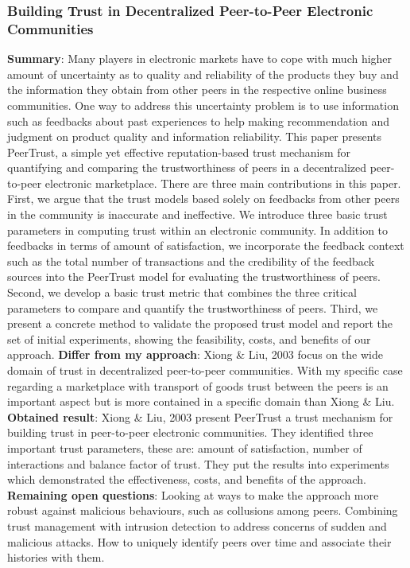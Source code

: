 \subsubsection{Building Trust in Decentralized Peer-to-Peer Electronic Communities \cite{buildTrust}}
\textbf{Summary}: Many players in electronic markets have to cope with much higher amount of uncertainty as to quality and reliability of the products they buy and the information they obtain from other peers in the respective online business communities. One way to address this uncertainty problem is to use information such as feedbacks about past experiences to help making recommendation and judgment on product quality and information reliability. This paper presents PeerTrust, a simple yet effective reputation-based trust mechanism for quantifying and comparing the trustworthiness of peers in a decentralized peer-to-peer electronic marketplace. There are three main contributions in this paper. First, we argue that the trust models based solely on feedbacks from other peers in the community is inaccurate and ineffective. We introduce three basic trust parameters in computing trust within an electronic community. In addition to feedbacks in terms of amount of satisfaction, we incorporate the feedback context such as the total number of transactions and the credibility of the feedback sources into the PeerTrust model for evaluating the trustworthiness of peers. Second, we develop a basic trust metric that combines the three critical parameters to compare and quantify the trustworthiness of peers. Third, we present a concrete method to validate the proposed trust model and report the set of initial experiments, showing the feasibility, costs, and benefits of our approach.\newline
\textbf{Differ from my approach}: Xiong \& Liu, 2003 focus on the wide domain of trust in decentralized peer-to-peer communities. With my specific case regarding a marketplace with transport of goods trust between the peers is an important aspect but is more contained in a specific domain than Xiong \& Liu.\newline
\textbf{Obtained result}: Xiong \& Liu, 2003 present PeerTrust a trust mechanism for building trust in peer-to-peer electronic communities. They identified three important trust parameters, these are: amount of satisfaction, number of interactions and balance factor of trust. They put the results into experiments which demonstrated the effectiveness, costs, and benefits of the approach.\newline
\textbf{Remaining open questions}: Looking at ways to make the approach more robust against malicious behaviours, such as collusions among peers. Combining trust management with intrusion detection to address concerns of sudden and malicious attacks. How to uniquely identify peers over time and associate their histories with them.\newline

